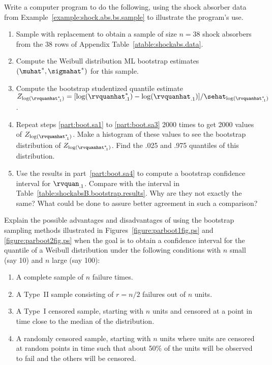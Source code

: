 \begin{exercise2}
Write a computer program to do the following, using
the shock absorber data
from Example~\ref{example:shock.abs.bs.sample} to illustrate the
program's use.
\begin{enumerate}
\item
\label{part:boot.sa1}
Sample with replacement to obtain a sample of size $n=38$ shock
absorbers from the 38 rows of Appendix
Table~\ref{atable:shockabs.data}.
\item
Compute the Weibull distribution ML bootstrap estimates
$(\muhat^{*},\sigmahat^{*})$ for this sample.
\item
\label{part:boot.sa3}
Compute the bootstrap studentized quantile estimate
$Z_{\log(\rvquanhat_{.1}^{*})} =
[\log(\rvquanhat^{*}_{.1})-\log(\rvquanhat_{.1})]/\sehat_{\log(\rvquanhat^{*}_{.1})}$.
\item
\label{part:boot.sa4}
Repeat steps \ref{part:boot.sa1} to \ref{part:boot.sa3}
2000 times to get 2000 values of
$Z_{\log(\rvquanhat_{.1}^{*})}$.
Make a histogram of these values to see the
bootstrap distribution of $Z_{\log(\rvquanhat_{.1}^{*})}$.
Find the .025 and .975 quantiles of this distribution.
\item
Use the results in part~\ref{part:boot.sa4} to compute a bootstrap
confidence interval for $\rvquan_{.1}$.  Compare with the interval in
Table~\ref{table:shockabsB.bootstrap.results}.  Why are they not
exactly the same? What could be done to assure better agreement in
such a comparison?
\end{enumerate}
\end{exercise2}


\begin{exercise}
Explain the possible advantages and disadvantages of using the
bootstrap sampling methods illustrated
in Figures~\ref{figure:parboot1fig.ps} and \ref{figure:parboot2fig.ps}
when the goal is to obtain a confidence interval for 
the quantile of a Weibull distribution under the following conditions
with $n$ small (say 10) and $n$ large (say 100):
\begin{enumerate}
\item
A complete sample of $n$ failure times.
\item
A Type~II sample consisting of $r=n/2$ failures out of $n$
units.
\item
A Type~I censored sample, starting with $n$ units
and censored at a point in time
close to the median of the distribution.
\item
A randomly censored sample, starting with $n$ units
where units are censored at random points  in time
such that about 50\% of the units will be observed to fail and the
others will be censored.
\end{enumerate}
\end{exercise}

